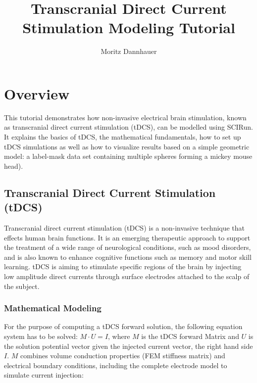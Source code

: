 \documentclass[fleqn,11pt,openany]{book}
\title{Transcranial Direct Current Stimulation Modeling Tutorial}
\author{Moritz Dannhauer}
\begin{document}


\maketitle


\chapter{Overview}

\begin{introduction}

This tutorial demonstrates how non-invasive electrical brain stimulation, known as transcranial direct current stimulation (tDCS), can be modelled using SCIRun.
It explains the basics of tDCS, the mathematical fundamentals, how to set up tDCS simulations as well as how to visualize results based on a simple geometric model: a label-mask data set containing multiple spheres forming a mickey mouse head).

\end{introduction}


\section{Transcranial Direct Current Stimulation (tDCS)}

Transcranial direct current stimulation (tDCS) is a non-invasive technique that effects human brain functions.
It is an emerging therapeutic approach to support the treatment of a wide range of neurological conditions, such as mood disorders, and is also known to enhance cognitive functions such as memory and motor skill learning.
tDCS is aiming to stimulate specific regions of the brain by injecting low amplitude direct currents through surface electrodes attached to the scalp of the subject.

\subsection{Mathematical Modeling}

For the purpose of computing a tDCS forward solution, the following equation system has to be solved: $M \cdot U = I$, where $M$ is the tDCS forward Matrix and $U$ is the solution potential vector given the injected current vector, the right hand side $I$.
$M$ combines volume conduction properties (FEM stiffness matrix) and electrical boundary conditions, including the complete electrode model to simulate current injection:
\end{document}
